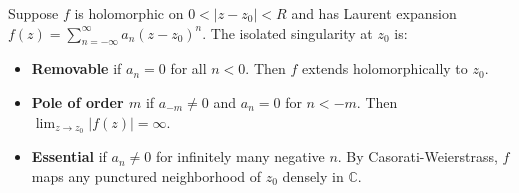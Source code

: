 Suppose $f$ is holomorphic on $0 < |z - z_0| < R$ and has Laurent expansion $f(z) = \sum_{n=-\infty}^{\infty} a_n (z-z_0)^n$. The isolated singularity at $z_0$ is:
\begin{itemize}
\item \textbf{Removable} if $a_n = 0$ for all $n < 0$. Then $f$ extends holomorphically to $z_0$.
\item \textbf{Pole of order $m$} if $a_{-m} \neq 0$ and $a_n = 0$ for $n < -m$. Then $\lim_{z \to z_0} |f(z)| = \infty$.
\item \textbf{Essential} if $a_n \neq 0$ for infinitely many negative $n$. By Casorati-Weierstrass, $f$ maps any punctured neighborhood of $z_0$ densely in $\mathbb{C}$.
\end{itemize}
